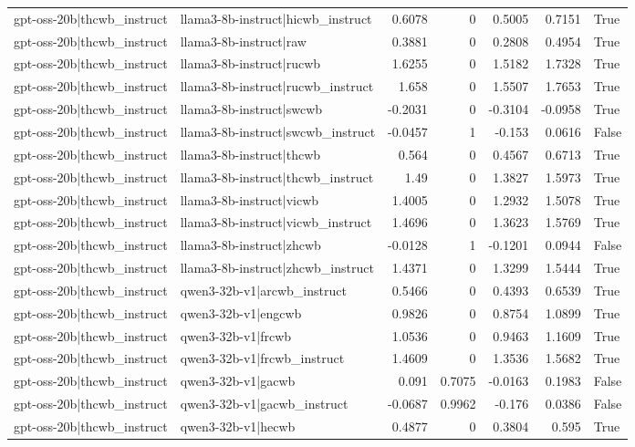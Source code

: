 \begin{table}
\begin{tabular}{l l r r r r l}
gpt-oss-20b|thcwb_instruct & llama3-8b-instruct|hicwb_instruct & 0.6078 & 0 & 0.5005 & 0.7151 & True \\
gpt-oss-20b|thcwb_instruct & llama3-8b-instruct|raw & 0.3881 & 0 & 0.2808 & 0.4954 & True \\
gpt-oss-20b|thcwb_instruct & llama3-8b-instruct|rucwb & 1.6255 & 0 & 1.5182 & 1.7328 & True \\
gpt-oss-20b|thcwb_instruct & llama3-8b-instruct|rucwb_instruct & 1.658 & 0 & 1.5507 & 1.7653 & True \\
gpt-oss-20b|thcwb_instruct & llama3-8b-instruct|swcwb & -0.2031 & 0 & -0.3104 & -0.0958 & True \\
gpt-oss-20b|thcwb_instruct & llama3-8b-instruct|swcwb_instruct & -0.0457 & 1 & -0.153 & 0.0616 & False \\
gpt-oss-20b|thcwb_instruct & llama3-8b-instruct|thcwb & 0.564 & 0 & 0.4567 & 0.6713 & True \\
gpt-oss-20b|thcwb_instruct & llama3-8b-instruct|thcwb_instruct & 1.49 & 0 & 1.3827 & 1.5973 & True \\
gpt-oss-20b|thcwb_instruct & llama3-8b-instruct|vicwb & 1.4005 & 0 & 1.2932 & 1.5078 & True \\
gpt-oss-20b|thcwb_instruct & llama3-8b-instruct|vicwb_instruct & 1.4696 & 0 & 1.3623 & 1.5769 & True \\
gpt-oss-20b|thcwb_instruct & llama3-8b-instruct|zhcwb & -0.0128 & 1 & -0.1201 & 0.0944 & False \\
gpt-oss-20b|thcwb_instruct & llama3-8b-instruct|zhcwb_instruct & 1.4371 & 0 & 1.3299 & 1.5444 & True \\
gpt-oss-20b|thcwb_instruct & qwen3-32b-v1|arcwb_instruct & 0.5466 & 0 & 0.4393 & 0.6539 & True \\
gpt-oss-20b|thcwb_instruct & qwen3-32b-v1|engcwb & 0.9826 & 0 & 0.8754 & 1.0899 & True \\
gpt-oss-20b|thcwb_instruct & qwen3-32b-v1|frcwb & 1.0536 & 0 & 0.9463 & 1.1609 & True \\
gpt-oss-20b|thcwb_instruct & qwen3-32b-v1|frcwb_instruct & 1.4609 & 0 & 1.3536 & 1.5682 & True \\
gpt-oss-20b|thcwb_instruct & qwen3-32b-v1|gacwb & 0.091 & 0.7075 & -0.0163 & 0.1983 & False \\
gpt-oss-20b|thcwb_instruct & qwen3-32b-v1|gacwb_instruct & -0.0687 & 0.9962 & -0.176 & 0.0386 & False \\
gpt-oss-20b|thcwb_instruct & qwen3-32b-v1|hecwb & 0.4877 & 0 & 0.3804 & 0.595 & True \\

\end{tabular}
\end{table}
